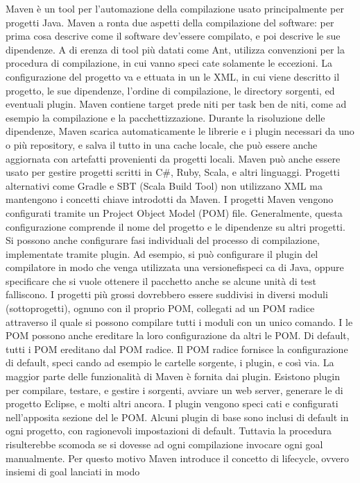 Maven \`e un tool per l'automazione della compilazione usato principalmente per progetti Java.  Maven a ronta due aspetti della compilazione del software:
per prima cosa descrive come il software dev'essere compilato, e poi descrive le sue dipendenze.  A di erenza di tool pi\`u datati come Ant, utilizza convenzioni per la procedura di compilazione, in cui vanno speci cate solamente le eccezioni.  La configurazione del progetto va e ettuata in un  le XML, in cui viene descritto il progetto, le sue dipendenze, l'ordine di compilazione, le directory sorgenti, ed eventuali plugin.  Maven contiene target prede niti per task ben de niti, come ad esempio la compilazione e la pacchettizzazione.  Durante la risoluzione delle dipendenze, Maven scarica automaticamente le librerie e i plugin necessari da uno o pi\`u repository, e salva il tutto in una cache locale, che  pu\`o  essere  anche  aggiornata  con  artefatti  provenienti  da  progetti  locali.
Maven pu\`o anche essere usato per gestire progetti scritti in C\#, Ruby, Scala, e altri linguaggi.  Progetti alternativi come Gradle e
SBT (Scala Build Tool) non utilizzano XML ma mantengono i concetti chiave
introdotti da Maven.
I  progetti  Maven  vengono  configurati  tramite  un  Project  Object  Model (POM) file.  Generalmente, questa configurazione comprende il nome del progetto e le dipendenze su altri progetti.  Si possono anche configurare fasi individuali del processo di compilazione, implementate tramite plugin.  Ad esempio, si pu\`o configurare il plugin del compilatore in modo che venga utilizzata una versionefispeci ca di Java, oppure specificare che si vuole ottenere il pacchetto anche se alcune unit\`a di test falliscono.  I progetti pi\`u grossi dovrebbero essere suddivisi in diversi moduli (sottoprogetti), ognuno con il proprio POM, collegati ad un POM radice attraverso il quale si possono compilare tutti i moduli con un unico comando.  I  le POM possono anche ereditare la loro configurazione da altri  le POM. Di default, tutti i POM ereditano dal POM radice.  Il POM radice fornisce la configurazione di default, speci cando ad esempio le cartelle sorgente, i plugin, e cos\`i via.
La maggior parte delle funzionalit\`a di Maven \`e fornita dai plugin.  Esistono plugin per compilare,  testare,  e gestire i sorgenti,  avviare un web server, generare  le di progetto Eclipse, e molti altri ancora. I plugin vengono speci cati e configurati nell'apposita sezione del  le POM. Alcuni plugin di base sono inclusi di default in ogni progetto, con ragionevoli impostazioni di default.  Tuttavia la procedura risulterebbe scomoda se si dovesse ad ogni compilazione invocare ogni goal manualmente.  Per questo motivo Maven introduce  il  concetto  di  lifecycle,  ovvero  insiemi  di  goal  lanciati  in  modo
